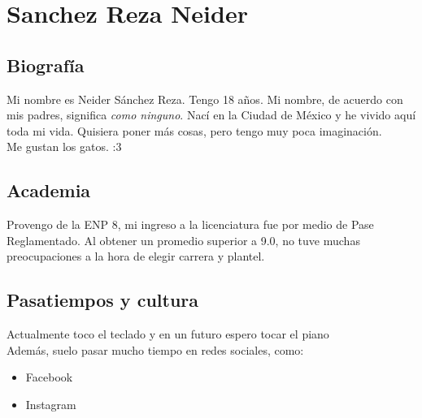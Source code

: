 \chapter{Sanchez Reza Neider}

\section{Biografía}
Mi nombre es Neider Sánchez Reza. Tengo 18 años. Mi nombre, de acuerdo con mis padres, significa \textit{como ninguno}. Nací en la Ciudad de México y he vivido aquí toda mi vida. Quisiera poner más cosas, pero tengo muy poca imaginación.\\ Me gustan los gatos. :3

\section{Academia}
Provengo de la ENP 8, mi ingreso a la licenciatura fue por medio de Pase Reglamentado. Al obtener un promedio superior a 9.0, no tuve muchas preocupaciones a la hora de elegir carrera y plantel.

\section{Pasatiempos y cultura}
Actualmente toco el teclado y en un futuro espero tocar el piano\\
Además, suelo pasar mucho tiempo en redes sociales, como:\\
\begin{itemize}
\item Facebook
\item Instagram
\end{itemize}
